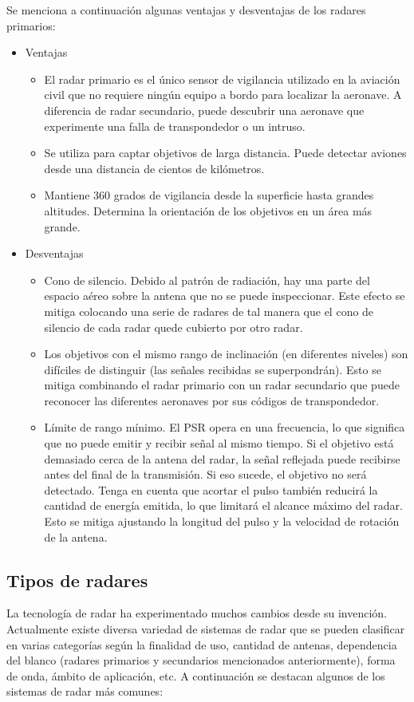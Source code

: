 Se menciona a continuación algunas ventajas y desventajas de los radares primarios:
\begin{itemize}
\item
Ventajas
	\begin{itemize}
	\item
El radar primario es el único sensor de vigilancia utilizado en la aviación civil que no requiere ningún equipo a bordo para localizar la aeronave. A diferencia de radar secundario, puede descubrir una aeronave que experimente una falla de transpondedor o un intruso.
	\item
Se utiliza para captar objetivos de larga distancia. Puede detectar aviones desde una distancia de cientos de kilómetros.
	\item
Mantiene 360 grados de vigilancia desde la superficie hasta grandes altitudes. Determina la orientación de los objetivos en un área más grande.
	\end{itemize}

\item
Desventajas
	\begin{itemize}
	\item
	Cono de silencio. Debido al patrón de radiación, hay una parte del espacio aéreo sobre la antena que no se puede inspeccionar. Este efecto se mitiga colocando una serie de radares de tal manera que el cono de silencio de cada radar quede cubierto por otro radar.
	\item
	Los objetivos con el mismo rango de inclinación (en diferentes niveles) son difíciles de distinguir (las señales recibidas se superpondrán). Esto se mitiga combinando el radar primario con un radar secundario que puede reconocer las diferentes aeronaves por sus códigos de transpondedor.
	\item
	Límite de rango mínimo. El PSR opera en una frecuencia, lo que significa que no puede emitir y recibir señal al mismo tiempo. Si el objetivo está demasiado cerca de la antena del radar, la señal reflejada puede recibirse antes del final de la transmisión. Si eso sucede, el objetivo no será detectado. Tenga en cuenta que acortar el pulso también reducirá la cantidad de energía emitida, lo que limitará el alcance máximo del radar. Esto se mitiga ajustando la longitud del pulso y la velocidad de rotación de la antena.
	\end{itemize}
\end{itemize}


\subsection{Tipos de radares}
La tecnología de radar ha experimentado muchos cambios desde su invención. Actualmente existe diversa variedad de sistemas de radar \citep{RadarHandbook} que se pueden clasificar en varias categorías según la finalidad de uso, cantidad de antenas, dependencia del blanco (radares primarios y secundarios mencionados anteriormente), forma de onda, ámbito de aplicación, etc. A continuación se destacan algunos de los sistemas de radar más comunes:

